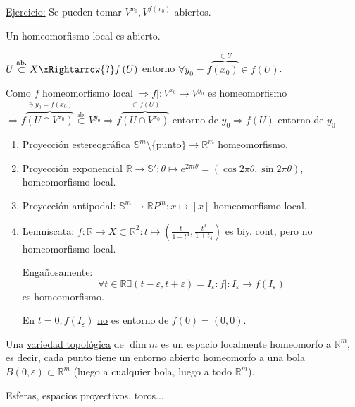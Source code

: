 \underline{Ejercicio:} Se pueden tomar $V^{x_0}, V^{f\left( x_0 \right)}$ abiertos.

\begin{prop}
Un homeomorfismo local es abierto.
\end{prop}
\begin{demo}
    $U \stackrel{\text{ab.}}{\subset} X \xRightarrow{?} f\left( U \right)$ entorno $\forall y_0 = f\overbrace{\left( x_0 \right)}^{\in U} \in f\left( U \right)$.

    Como $f$ homeomorfismo local $\Rightarrow f| : V^{x_0} \rightarrow V^{y_0}$ es homeomorfismo $\Rightarrow f\overbrace{\left( U \cap V^{x_0} \right)}^{\ni y_0 = f\left( x_0 \right)} \stackrel{\text{ab.}}{\subset} V^{y_0} \Rightarrow f\overbrace{\left( U \cap V^{x_0} \right)}^{\subset f\left( U \right)}$ entorno de $y_0 \Rightarrow f\left( U \right)$ entorno de $y_0$.
\end{demo}

\begin{ej}[¡Importantes!]
\begin{enumerate}
    \item Proyección estereográfica $\mathbb{S}^{m} \setminus \{\text{punto}\} \rightarrow \mathbb{R}^m$ homeomorfismo.
    \item Proyección exponencial $\mathbb{R} \rightarrow \mathbb{S}': \theta \mapsto e^{2\pi i\theta} = \left( \cos 2\pi \theta, \sin 2\pi \theta \right)$, homeomorfismo local.
    \item Proyección antipodal: $\mathbb{S}^m \rightarrow \mathbb{R}P^{m}: x \mapsto \left[ x \right]$ homeomorfismo local.
    \item Lemniscata: $f: \mathbb{R} \rightarrow X \subset \mathbb{R}^2: t \mapsto \left( \frac{t}{1 + t^4}, \frac{t^3}{1 + t_4} \right)$ es biy. cont, pero \underline{no} homeomorfismo local.

    Engañosamente: 
    \[
        \forall t \in \mathbb{R} \exists \left( t - \varepsilon, t + \varepsilon \right) = I_{\varepsilon}: f| : I_{\varepsilon} \rightarrow f\left( I_{\varepsilon} \right) 
    \]
    es homeomorfismo.

    En $t = 0, f\left( I_{\varepsilon} \right)$ \underline{no} es entorno de $f\left( 0 \right) = \left( 0, 0 \right)$.
\end{enumerate} 
\end{ej}

\begin{defi}
Una \underline{variedad topológica} de $\dim m$ es un espacio localmente homeomorfo a $\mathbb{R}^m$, es decir, cada punto tiene un entorno abierto homeomorfo a una bola $B\left( 0, \varepsilon \right) \subset \mathbb{R}^m$ (luego a cualquier bola, luego a todo $\mathbb{R}^m$).
\end{defi}
\begin{ej}
Esferas, espacios proyectivos, toros...
\end{ej}

